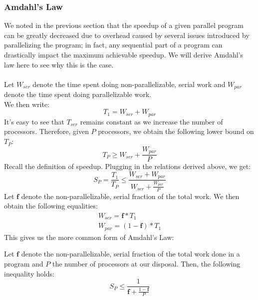 \documentclass[main.tex]{subfiles}
\begin{document}

\subsubsection{Amdahl's Law}
We noted in the previous section that the speedup of a given parallel program can be greatly decreased due to overhead caused by several issues introduced by parallelizing the program; in fact, any sequential part of a program can drastically impact the maximum achievable speedup. We will derive Amdahl's law here to see why this is the case.\\
\\
Let $W_{ser}$ denote the time spent doing non-parallelizable, serial work and $W_{par}$ denote the time spent doing parallelizable work.\\
We then write:
\begin{equation*}
    T_1 = W_{ser} + W_{par}
\end{equation*}
It's easy to see that $T_{ser}$ remains constant as we increase the number of processors. Therefore, given $P$ processors, we obtain the following lower bound on $T_P$:
\begin{equation*}
    T_P \geq W_{ser} + \frac{W_{par}}{P}
\end{equation*}
Recall the definition of speedup. Plugging in the relations derived above, we get:
\begin{equation*}
    S_P = \frac{T_1}{T_P} \leq \frac{W_{ser} + W_{par}}{W_{ser} + \frac{W_{par}}{P}}
\end{equation*}
Let $\mathbf{f}$ denote the non-parallelizable, serial fraction of the total work. We then obtain the following equalities:
\begin{gather*}
    W_{ser} = \mathbf{f}*T_1 \\
    W_{par} = (1-\mathbf{f})*T_1
\end{gather*}
This gives us the more common form of Amdahl's Law:
\begin{theorem} 
    Let $\mathbf{f}$ denote the non-parallelizable, serial fraction of the total work done in a program and $P$ the number of processors at our disposal. Then, the following inequality holds:
    \begin{equation*}
        S_P \leq \frac{1}{\mathbf{f} + \frac{1-\mathbf{f}}{P}}
    \end{equation*}
\end{theorem}
\end{document}
